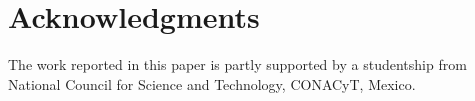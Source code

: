 \documentclass{sigchi}
\begin{document}
\section{Acknowledgments}
The work reported in this paper is partly supported by a studentship from
National Council for Science and Technology, CONACyT, Mexico.



%
%
%
%
%
\balance





\end{document}
